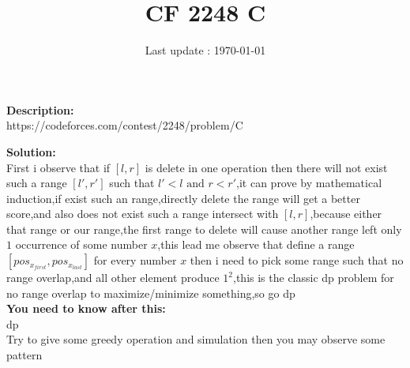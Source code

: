 \documentclass{article}
\begin{document}
\title{\textbf{CF 2248 C}}
\author{}
\date{Last update : \today}

\maketitle

\noindent \textbf{Description:}\\
https://codeforces.com/contest/2248/problem/C

\noindent \textbf{Solution:}\\
First i observe that if $[l,r]$ is delete in one operation then there will not exist such a range $[l',r']$ such that $l'<l \text{ and } r<r'$,it can prove by mathematical induction,if exist such an range,directly delete the range will get a better score,and also does not exist such a range intersect with $[l,r]$,because either that range or our range,the first range to delete will cause another range left only $1$ occurrence of some number $x$,this lead me observe that define a range $[pos_{x_{first}},pos_{x_{last}}]$ for every number $x$ then i need to pick some range such that no range overlap,and all other element produce $1^2$,this is the classic dp problem for no range overlap to maximize/minimize something,so go dp
\\
\noindent \textbf{You need to know after this:}\\
dp\\
Try to give some greedy operation and simulation then you may observe some pattern
\end{document}
